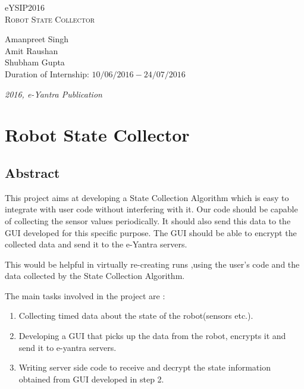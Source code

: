 \documentclass[a4paper,12pt,oneside]{book}
\begin{document}
\begin{titlepage}
\raggedright
{\Large eYSIP2016\\[1cm]}
{\Huge\scshape Robot State Collector\\[.1in]}
\vfill
\begin{flushright}
{\large Amanpreet Singh \\}
{\large Amit Raushan \\}
{\large Shubham Gupta \\}
{\large Duration of Internship: $ 10/06/2016-24/07/2016 $ \\}
\end{flushright}

{\itshape 2016, e-Yantra Publication}

\end{titlepage}

\tableofcontents


\chapter[Robot State Collector]{Robot State Collector}
\section{Abstract}

\hspace{5mm}This project aims at developing a State Collection Algorithm which is easy to integrate with user code without interfering with it. Our code should be capable of collecting the sensor values periodically. It should also send this data to the GUI developed for this specific purpose. The GUI should be able to encrypt the collected data and send it to the e-Yantra servers.

This would be helpful in virtually re-creating runs ,using the user's code and the data collected by the State Collection Algorithm.

The main tasks involved in the project are :

\begin{enumerate}

    \item Collecting timed data about the state of the robot(sensors etc.).
    \item Developing a GUI that picks up the data from the robot, encrypts it and send it to e-yantra servers.
    \item Writing server side code to receive and decrypt the state information obtained from GUI developed in step 2.

\end{enumerate}
\newpage
\end{document}
